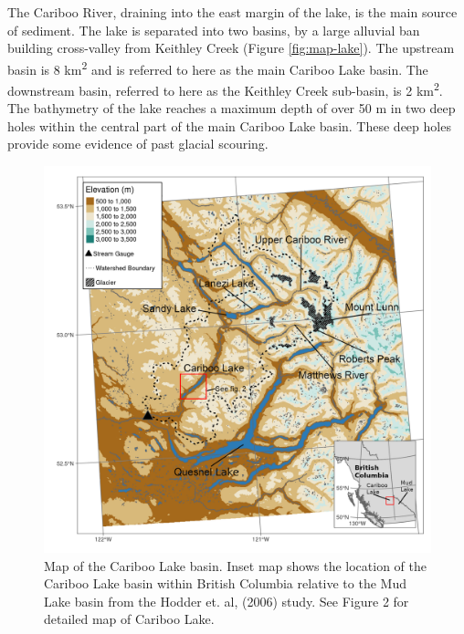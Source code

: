 \documentclass[Royal,times,doublespace,sageh]{sagej}
\begin{document}
The Cariboo River, draining into the east margin of the lake, is the
main source of sediment. The lake is separated into two basins, by a
large alluvial ban building cross-valley from Keithley Creek (Figure
\ref{fig:map-lake}). The upstream basin is 8 km\textsuperscript{2} and
is referred to here as the main Cariboo Lake basin. The downstream
basin, referred to here as the Keithley Creek sub-basin, is 2
km\textsuperscript{2}. The bathymetry of the lake reaches a maximum
depth of over 50 m in two deep holes within the central part of the main
Cariboo Lake basin. These deep holes provide some evidence of past
glacial scouring.

\begin{figure}

{\centering \includegraphics[width=1\linewidth]{figs/cl_small_scale_inset_labels_gimp} 

}

\caption{Map of the Cariboo Lake basin. Inset map shows the location of the Cariboo Lake basin within British Columbia relative to the Mud Lake basin from the Hodder et. al, (2006) study. See Figure 2 for detailed map of Cariboo Lake.\label{fig:map-basin}}\label{fig:map-basin}
\end{figure}
\end{document}
